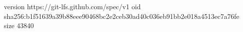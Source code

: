 version https://git-lfs.github.com/spec/v1
oid sha256:b1f51639a39b88eee90468bc2e2ceb30ad40c036eb91bb2e018a4513ec7a76fe
size 43840

